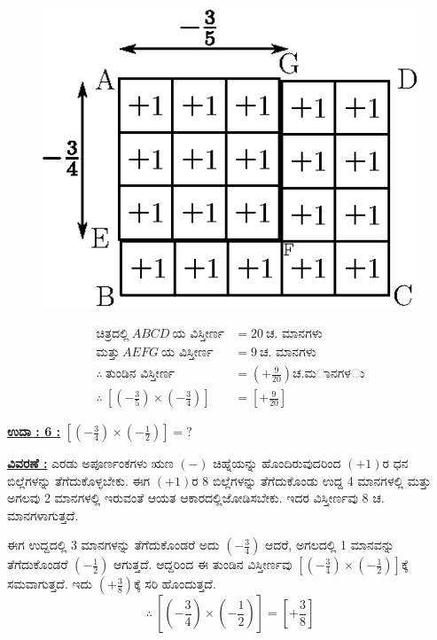\vspace{-.2cm}
\begin{figure}[H]
\centering
\includegraphics[scale=0.7]{src/figure/chap3/fig3-27b.eps}
\end{figure}
\vskip -1.2cm
\begin{align*}
\text{ಚಿತ್ರದಲ್ಲಿ}~ ABCD ~\text{ಯ ವಿಸ್ತೀರ್ಣ} & = 20~ \text{ಚ. ಮಾನಗಳು}\\
\text{ಮತ್ತು}~ AEFG ~\text{ಯ ವಿಸ್ತೀರ್ಣ} & = 9~ \text{ಚ. ಮಾನಗಳು}\\
\therefore~ \text{ತುಂಡಿನ ವಿಸ್ತೀರ್ಣ} & = \left(+\frac{9}{20} \right) ಚ. ಮಾನಗಳು\\
\therefore~ \left[\left(-\frac{3}{5}\right) \times \left(-\frac{3}{4}\right) \right] & = \left[+ \frac{9}{20} \right]
\end{align*}

\noindent
{\textbf{\underline{ಉದಾ : 6 :}}} $\left[\left(-\frac{3}{4}\right) \times \left(-\frac{1}{2}\right) \right] = ?$

\vspace{.2cm}

\noindent
{\textbf{\underline{ವಿವರಣೆ :}}} ಎರಡು ಅಪೂರ್ಣಂಕಗಳು ಋಣ $(-)$ ಚಿಹ್ನೆಯನ್ನು ಹೊಂದಿರುವುದರಿಂದ $(+1)$ರ ಧನ ಬಿಲ್ಲೆಗಳನ್ನು ತೆಗೆದುಕೊಳ್ಳಬೇಕು. ಈಗ $(+1)$ರ 8 ಬಿಲ್ಲೆಗಳನ್ನು ತೆಗೆದು\-ಕೊಂಡು ಉದ್ದ 4 ಮಾನಗಳಲ್ಲಿ ಮತ್ತು ಅಗಲವು 2 ಮಾನಗಳಲ್ಲಿ ಇರುವಂತೆ ಆಯತ ಆಕಾರದಲ್ಲಿ\break  ಜೋಡಿಸಬೇಕು. ಇದರ ವಿಸ್ತೀರ್ಣವು 8 ಚ. ಮಾನಗಳಾಗುತ್ತದೆ. 

ಈಗ ಉದ್ದದಲ್ಲಿ 3 ಮಾನಗಳನ್ನು ತೆಗೆದುಕೊಂಡರೆ ಅದು $\left(-\frac{3}{4}\right)$ ಆದರೆ, ಅಗಲದಲ್ಲಿ 1 ಮಾನವನ್ನು ತೆಗೆದುಕೊಂಡರೆ $\left(-\frac{1}{2} \right)$ ಆಗುತ್ತದೆ. ಆದ್ದರಿಂದ ಈ ತುಂಡಿನ ವಿಸ್ತೀರ್ಣವು $\left[\left(-\frac{3}{4}\right) \times \left(-\frac{1}{2}\right) \right]$ಕ್ಕೆ ಸಮವಾಗುತ್ತದೆ. ಇದು $\left(+\frac{3}{8}\right)$ಕ್ಕೆ ಸರಿ ಹೊಂದುತ್ತದೆ. 
$$
\therefore~ \left[\left(-\frac{3}{4}\right) \times \left(-\frac{1}{2}\right) \right] = \left[+ \frac{3}{8} \right]
$$

